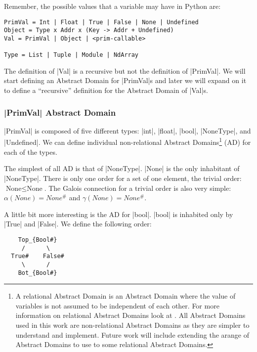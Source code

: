 Remember, the possible values that a variable may have in Python are:

\begin{verbatim}
PrimVal = Int | Float | True | False | None | Undefined
Object = Type x Addr x (Key -> Addr + Undefined)
Val = PrimVal | Object | <prim-callable>

Type = List | Tuple | Module | NdArray
\end{verbatim}

The definition of \pycode|Val| is a recursive but not the definition of
\pycode|PrimVal|. We will start defining an Abstract Domain for
\pycode|PrimVal|s and later we will expand on it to define a
\enquote{recursive} definition for the Abstract Domain of \pycode|Val|s.

\subsubsection*{\texorpdfstring{\pycode|PrimVal| Abstract
Domain}{PrimVal Abstract Domain}}\label{primval-abstract-domain}

\pycode|PrimVal| is composed of five different types: \pycode|int|,
\pycode|float|, \pycode|bool|, \pycode|NoneType|, and
\pycode|Undefined|. We can define individual non-relational Abstract
Domains\footnote{A relational Abstract Domain is an Abstract Domain
  where the value of variables is not assumed to be independent of each
  other. For more information on relational Abstract Domains look at
  {}. All Abstract Domains used
  in this work are non-relational Abstract Domains as they are simpler
  to understand and implement. Future work will include extending the
  arange of Abstract Domains to use to some relational Abstract Domains.}
(AD) for each of the types.

The simplest of all AD is that of \pycode|NoneType|. \pycode|None| is
the only inhabitant of \pycode|NoneType|. There is only one order for a
set of one element, the trivial order: \(\text{None} \le \text{None}\).
The Galois connection for a trivial order is also very simple:
\(\alpha(None) = None^{\#}\) and \(\gamma(None) = None^{\#}\).

A little bit more interesting is the AD for \pycode|bool|. \pycode|bool|
is inhabited only by \pycode|True| and \pycode|False|. We define the
following order:

{}

\begin{verbatim}
    Top_{Bool#}
     /      \
  True#    False#
     \      /
    Bot_{Bool#}
\end{verbatim}

